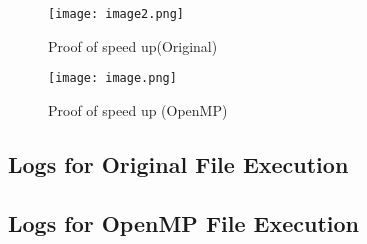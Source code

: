 \documentclass{article}
\begin{document}
\begin{figure}[h]
    \centering
    \begin{minipage}{0.48\textwidth}
        \centering
        \texttt{[image: image2.png]}
        \caption{Proof of speed up(Original)}
        \label{fig: prof of speed up}
    \end{minipage}
    \hfill
    \begin{minipage}{0.48\textwidth}
        \centering
        \texttt{[image: image.png]}
        \caption{Proof of speed up (OpenMP) }
        \label{fig: prof of speed up 2}
    \end{minipage}
\end{figure}

\clearpage
\begin{scriptsize}
\subsection{Logs for Original File Execution} \label{sec: original logs}


\clearpage
\subsection{Logs for OpenMP File Execution} \label{sec: OpenMP logs}

\end{scriptsize}
\end{document}
